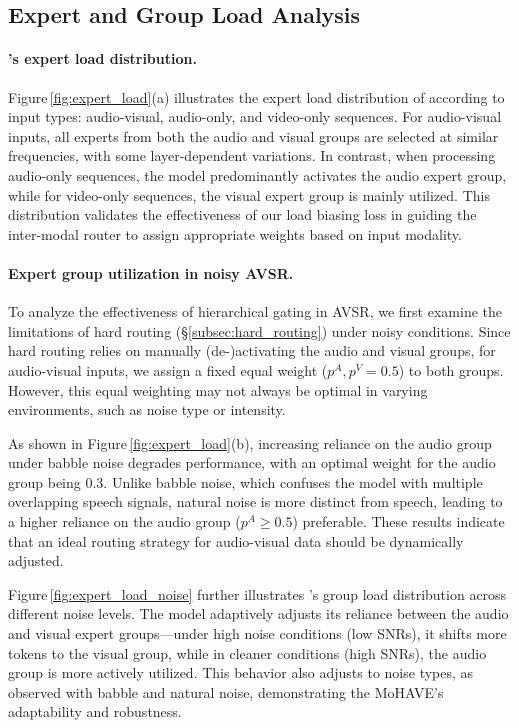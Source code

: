 \subsection{Expert and Group Load Analysis}
\label{subsec:analysis_load}



\paragraph{\ourmodel's expert load distribution.}
Figure\,\ref{fig:expert_load}(a) illustrates the expert load distribution of \ourmodel according to input types: audio-visual, audio-only, and video-only sequences. For audio-visual inputs, all experts from both the audio and visual groups are selected at similar frequencies, with some layer-dependent variations. In contrast, when processing audio-only sequences, the model predominantly activates the audio expert group, while for video-only sequences, the visual expert group is mainly utilized. This distribution validates the effectiveness of our load biasing loss in guiding the inter-modal router to assign appropriate weights based on input modality.

\vspace*{-10pt}
\paragraph{Expert group utilization in noisy AVSR.}
To analyze the effectiveness of hierarchical gating in AVSR, we first examine the limitations of hard routing (\S\ref{subsec:hard_routing}) under noisy conditions. Since hard routing relies on manually (de-)activating the audio and visual groups, for audio-visual inputs, we assign a fixed equal weight ($p^A, p^V = 0.5$) to both groups.
However, this equal weighting may not always be optimal in varying environments, such as noise type or intensity.

As shown in Figure\,\ref{fig:expert_load}(b), increasing reliance on the audio group under babble noise degrades performance, with an optimal weight for the audio group being $0.3$.
Unlike babble noise, which confuses the model with multiple overlapping speech signals, natural noise is more distinct from speech, leading to a higher reliance on the audio group ($p^A \ge 0.5$) preferable.
These results indicate that an ideal routing strategy for audio-visual data should be dynamically adjusted.

Figure\,\ref{fig:expert_load_noise} further illustrates \ourmodel's group load distribution across different noise levels. The model adaptively adjusts its reliance between the audio and visual expert groups---under high noise conditions (low SNRs), it shifts more tokens to the visual group, while in cleaner conditions (high SNRs), the audio group is more actively utilized. This behavior also adjusts to noise types, as observed with babble and natural noise, demonstrating the MoHAVE’s adaptability and robustness.
%


